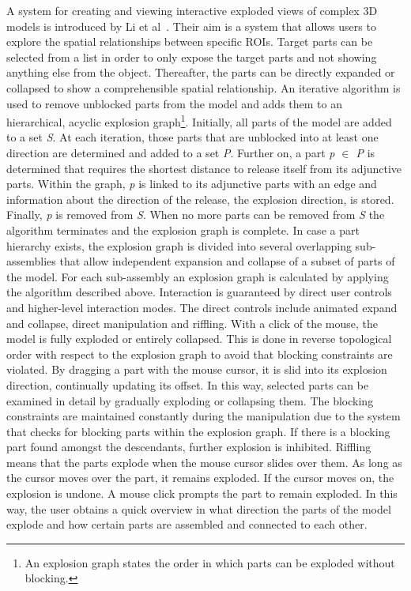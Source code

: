 A system for creating and viewing interactive exploded views of complex 3D models is introduced by Li et al~\cite{jour:generationExplodedView}. Their aim is a system that allows users to explore the spatial relationships between specific ROIs. Target parts can be selected from a list in order to only expose the target parts and not showing anything else from the object. Thereafter, the parts can be directly expanded or collapsed to show a comprehensible spatial relationship. An iterative algorithm is used to remove unblocked parts from the model and adds them to an hierarchical, acyclic explosion graph\footnote{An explosion graph states the order in which parts can be exploded without blocking.}. Initially, all parts of the model are added to a set \emph{S}. At each iteration, those parts that are unblocked into at least one direction are determined and added to a set \emph{P}. Further on, a part \emph{p $\in$ P} is determined that requires the shortest distance to release itself from its adjunctive parts. Within the graph, \emph{p} is linked to its adjunctive parts with an edge and information about the direction of the release, the explosion direction, is stored. Finally, \emph{p} is removed from \emph{S}. When no more parts can be removed from \emph{S} the algorithm terminates and the explosion graph is complete. In case a part hierarchy exists, the explosion graph is divided into several overlapping sub-assemblies that allow independent expansion and collapse of a subset of parts of the model. For each sub-assembly an explosion graph is calculated by applying the algorithm described above. Interaction is guaranteed by direct user controls and higher-level interaction modes. The direct controls include animated expand and collapse, direct manipulation and riffling. With a click of the mouse, the model is fully exploded or entirely collapsed. This is done in reverse topological order with respect to the explosion graph to avoid that blocking constraints are violated. By dragging a part with the mouse cursor, it is slid into its explosion direction, continually updating its offset. In this way, selected parts can be examined in detail by gradually exploding or collapsing them. The blocking constraints are maintained constantly during the manipulation due to the system that checks for blocking parts within the explosion graph. If there is a blocking part found amongst the descendants, further explosion is inhibited. Riffling means that the parts explode when the mouse cursor slides over them. As long as the cursor moves over the part, it remains exploded. If the cursor moves on, the explosion is undone. A mouse click prompts the part to remain exploded. In this way, the user obtains a quick overview in what direction the parts of the model explode and how certain parts are assembled and connected to each other.

